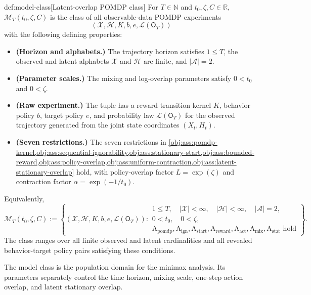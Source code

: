 \documentclass[11pt]{article}
\begin{document}
\begin{definitionv}{def:model-class}[Latent-overlap POMDP class]
For \(T\in\mathbb N\) and \(t_0,\zeta,C\in\mathbb R\), \(\mathcal M_T(t_0,\zeta,C)\) is the class of all observable-data POMDP experiments
\[
(\mathcal X,\mathcal H,K,b,e,\mathcal L(\mathsf O_T))
\]
with the following defining properties:
\begin{itemize}
\item \textbf{(Horizon and alphabets.)} The trajectory horizon satisfies \(1\le T\), the observed and latent alphabets \(\mathcal X\) and \(\mathcal H\) are finite, and \(|\mathcal A|=2\).
\item \textbf{(Parameter scales.)} The mixing and log-overlap parameters satisfy \(0<t_0\) and \(0<\zeta\).
\item \textbf{(Raw experiment.)} The tuple has a reward-transition kernel \(K\), behavior policy \(b\), target policy \(e\), and probability law \(\mathcal L(\mathsf O_T)\) for the observed trajectory generated from the joint state coordinates \((X_t,H_t)\).
\item \textbf{(Seven restrictions.)} The seven restrictions in \cref{obj:ass:pomdp-kernel,obj:ass:sequential-ignorability,obj:ass:stationary-start,obj:ass:bounded-reward,obj:ass:policy-overlap,obj:ass:uniform-contraction,obj:ass:latent-stationary-overlap} hold, with policy-overlap factor \(L=\exp(\zeta)\) and contraction factor \(\alpha=\exp(-1/t_0)\).
\end{itemize}
Equivalently,
\[
\mathcal M_T(t_0,\zeta,C)
:=
\left\{
(\mathcal X,\mathcal H,K,b,e,\mathcal L(\mathsf O_T)):
\begin{array}{l}
1\le T,\quad |\mathcal X|<\infty,\quad |\mathcal H|<\infty,\quad |\mathcal A|=2,\\
0<t_0,\quad 0<\zeta,\\
\mathrm A_{\mathrm{pomdp}},\mathrm A_{\mathrm{ign}},\mathrm A_{\mathrm{start}},
\mathrm A_{\mathrm{reward}},\mathrm A_{\mathrm{act}},
\mathrm A_{\mathrm{mix}},\mathrm A_{\mathrm{stat}}\text{ hold}
\end{array}
\right\}.
\]
The class ranges over all finite observed and latent cardinalities and all revealed behavior-target policy pairs satisfying these conditions.
\end{definitionv}

The model class  is the population domain for the minimax analysis. Its parameters separately control the time horizon, mixing scale, one-step action overlap, and latent stationary overlap.
\end{document}
